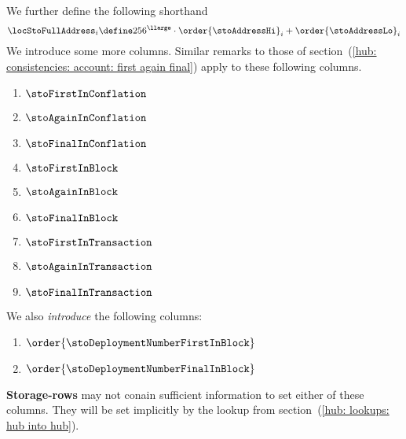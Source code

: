 We further define the following shorthand
\[
	\locStoFullAddress_{i}
	\define
	256^\llarge \cdot \order{\stoAddressHi}_{i} + \order{\stoAddressLo}_{i}
\]
\noindent We introduce some more columns.
Similar remarks to those of section~(\ref{hub: consistencies: account: first again final}) apply to these following columns.
\begin{multicols}{3}
	\begin{enumerate}
		\item $\stoFirstInConflation$
		\item $\stoAgainInConflation$
		\item $\stoFinalInConflation$
		\item $\stoFirstInBlock$
		\item $\stoAgainInBlock$
		\item $\stoFinalInBlock$
		\item $\stoFirstInTransaction$
		\item $\stoAgainInTransaction$
		\item $\stoFinalInTransaction$
	\end{enumerate}
\end{multicols}
We also \emph{introduce} the following columns:
\begin{multicols}{2}
	\begin{enumerate}
		\item $\order{\stoDeploymentNumberFirstInBlock}$
		\item $\order{\stoDeploymentNumberFinalInBlock}$
	\end{enumerate}
\end{multicols}
\noindent \textbf{Storage-rows} may not conain sufficient information to set either of these columns.
They will be set implicitly by the lookup from section~(\ref{hub: lookups: hub into hub}).
